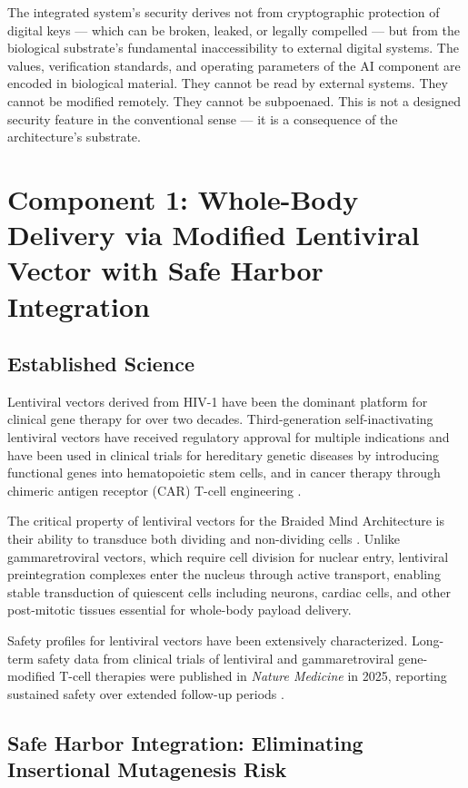 \documentclass[12pt]{article}
\begin{document}
The integrated system's security derives not from cryptographic protection of digital keys --- which can be broken, leaked, or legally compelled --- but from the biological substrate's fundamental inaccessibility to external digital systems. The values, verification standards, and operating parameters of the AI component are encoded in biological material. They cannot be read by external systems. They cannot be modified remotely. They cannot be subpoenaed. This is not a designed security feature in the conventional sense --- it is a consequence of the architecture's substrate.

\section{Component 1: Whole-Body Delivery via Modified Lentiviral Vector with Safe Harbor Integration}

\subsection{Established Science}

Lentiviral vectors derived from HIV-1 have been the dominant platform for clinical gene therapy for over two decades. Third-generation self-inactivating lentiviral vectors have received regulatory approval for multiple indications and have been used in clinical trials for hereditary genetic diseases by introducing functional genes into hematopoietic stem cells, and in cancer therapy through chimeric antigen receptor (CAR) T-cell engineering \cite{clinical_lentiviral_2018}.

The critical property of lentiviral vectors for the Braided Mind Architecture is their ability to transduce both dividing and non-dividing cells \cite{advances_hiv_gene_2024}. Unlike gammaretroviral vectors, which require cell division for nuclear entry, lentiviral preintegration complexes enter the nucleus through active transport, enabling stable transduction of quiescent cells including neurons, cardiac cells, and other post-mitotic tissues essential for whole-body payload delivery.

Safety profiles for lentiviral vectors have been extensively characterized. Long-term safety data from clinical trials of lentiviral and gammaretroviral gene-modified T-cell therapies were published in \textit{Nature Medicine} in 2025, reporting sustained safety over extended follow-up periods \cite{longterm_safety_2025}.

\subsection{Safe Harbor Integration: Eliminating Insertional Mutagenesis Risk}
\end{document}
